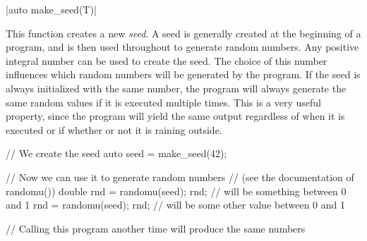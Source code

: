 \funcitem \cppinline|auto make_seed(T)| 

This function creates a new \emph{seed}. A seed is generally created at the beginning of a program, and is then used throughout to generate random numbers. Any positive integral number can be used to create the seed. The choice of this number influences which random numbers will be generated by the program. If the seed is always initialized with the same number, the program will always generate the same random values if it is executed multiple times. This is a very useful property, since the program will yield the same output regardless of when it is executed or if whether or not it is raining outside.

\begin{example}
\begin{cppcode}
// We create the seed
auto seed = make_seed(42);

// Now we can use it to generate random numbers
// (see the documentation of randomu())
double rnd = randomu(seed);
rnd; // will be something between 0 and 1
rnd = randomu(seed);
rnd; // will be some other value between 0 and 1

// Calling this program another time will produce the same numbers
\end{cppcode}
\end{example}

